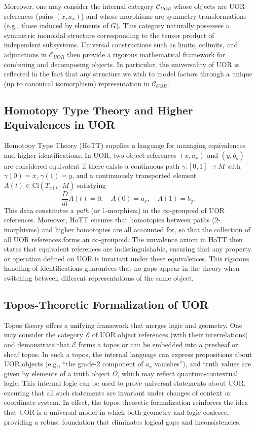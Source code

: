 \documentclass[12pt]{article}
\begin{document}
Moreover, one may consider the internal category $\mathcal{C}_{UOR}$ whose objects are UOR references (pairs $(x,a_x)$) and whose morphisms are symmetry transformations (e.g., those induced by elements of $G$). This category naturally possesses a symmetric monoidal structure corresponding to the tensor product of independent subsystems. Universal constructions such as limits, colimits, and adjunctions in $\mathcal{C}_{UOR}$ then provide a rigorous mathematical framework for combining and decomposing objects. In particular, the universality of UOR is reflected in the fact that any structure we wish to model factors through a unique (up to canonical isomorphism) representation in $\mathcal{C}_{UOR}$.

\subsection{Homotopy Type Theory and Higher Equivalences in UOR}
Homotopy Type Theory (HoTT) supplies a language for managing equivalences and higher identifications. In UOR, two object references $(x,a_x)$ and $(y,b_y)$ are considered equivalent if there exists a continuous path $\gamma: [0,1] \to M$ with $\gamma(0)=x$, $\gamma(1)=y$, and a continuously transported element $A(t) \in \mathrm{Cl}(T_{\gamma(t)}M)$ satisfying
\[
\frac{D}{dt} A(t) = 0,\quad A(0)=a_x,\quad A(1)=b_y.
\]
This data constitutes a \emph{path} (or 1-morphism) in the $\infty$-groupoid of UOR references. Moreover, HoTT ensures that homotopies between paths (2-morphisms) and higher homotopies are all accounted for, so that the collection of all UOR references forms an $\infty$-groupoid. The univalence axiom in HoTT then states that equivalent references are indistinguishable, ensuring that any property or operation defined on UOR is invariant under these equivalences. This rigorous handling of identifications guarantees that no gaps appear in the theory when switching between different representations of the same object.

\subsection{Topos-Theoretic Formalization of UOR}
Topos theory offers a unifying framework that merges logic and geometry. One may consider the category $\mathcal{E}$ of UOR object references (with their interrelations) and demonstrate that $\mathcal{E}$ forms a topos or can be embedded into a presheaf or sheaf topos. In such a topos, the internal language can express propositions about UOR objects (e.g., ``the grade-2 component of $a_x$ vanishes''), and truth values are given by elements of a truth object $\Omega$, which may reflect quantum-contextual logic. This internal logic can be used to prove universal statements about UOR, ensuring that all such statements are invariant under changes of context or coordinate system. In effect, the topos-theoretic formalization reinforces the idea that UOR is a universal model in which both geometry and logic coalesce, providing a robust foundation that eliminates logical gaps and inconsistencies.
\end{document}
